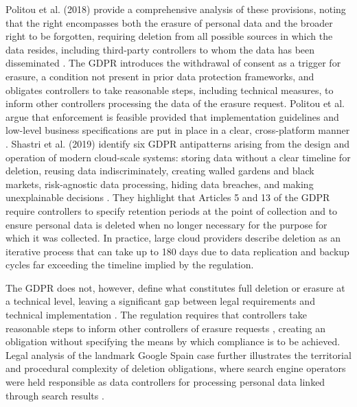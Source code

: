 Politou et al. (2018) provide a comprehensive analysis of these provisions, 
noting that the right encompasses both the erasure of personal data and the broader right to be 
forgotten, requiring deletion from all possible sources in which the data resides, including 
third-party controllers to whom the data has been disseminated \cite{Politou2018}. The GDPR 
introduces the withdrawal of consent as a trigger for erasure, a condition not present in prior 
data protection frameworks, and obligates controllers to take reasonable steps, including technical 
measures, to inform other controllers processing the data of the erasure request. Politou et al. 
argue that enforcement is feasible provided that implementation guidelines and low-level business 
specifications are put in place in a clear, cross-platform manner \cite{Politou2018}.
Shastri et al. (2019) identify six GDPR antipatterns arising from the design and operation of 
modern cloud-scale systems: storing data without a clear timeline for deletion, reusing data 
indiscriminately, creating walled gardens and black markets, risk-agnostic data processing, hiding 
data breaches, and making unexplainable decisions \cite{Shastri2019gdpr}. They highlight that 
Articles 5 and 13 of the GDPR require controllers to specify retention periods at the point of 
collection and to ensure personal data is deleted when no longer necessary for the purpose for 
which it was collected. In practice, large cloud providers describe deletion as an iterative 
process that can take up to 180 days due to data replication and backup cycles far exceeding the 
timeline implied by the regulation.

The GDPR does not, however, define what constitutes full deletion or erasure at a technical level, 
leaving a significant gap between legal requirements and technical implementation \cite{AlgorithmicDestruction}. 
The regulation requires that controllers take reasonable steps to inform other controllers of erasure requests \cite{vanOoijen2019},
creating an obligation without specifying the means by which compliance is to be achieved. Legal 
analysis of the landmark Google Spain case further illustrates the territorial and procedural 
complexity of deletion obligations, where search engine operators were held responsible as data 
controllers for processing personal data linked through search results \cite{AlgorithmicDestruction}.

